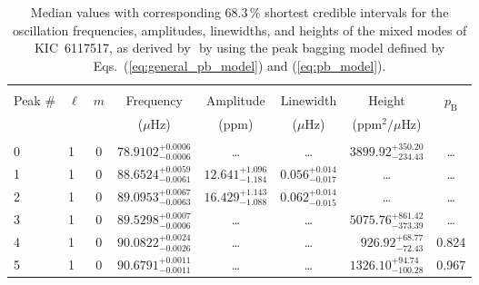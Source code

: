 \begin{table*}[!]
\caption{Median values with corresponding 68.3\,\% shortest credible intervals for the oscillation frequencies, amplitudes, linewidths, and heights of the mixed modes of KIC~6117517, as derived by \diamonds\,\,by using the peak bagging model defined by Eqs.~(\ref{eq:general_pb_model}) and (\ref{eq:pb_model}).}
\label{tab:6117517m}
\centering
\begin{tabular}{llcrrlrc}
\hline\hline
\\[-8pt]          
Peak \# & $\ell$ & $m$ & \multicolumn{1}{c}{Frequency} & \multicolumn{1}{c}{Amplitude} & \multicolumn{1}{c}{Linewidth} & \multicolumn{1}{c}{Height}& $p_\mathrm{B}$\\
 & & & \multicolumn{1}{c}{($\mu$Hz)} & \multicolumn{1}{c}{(ppm)} & \multicolumn{1}{c}{($\mu$Hz)} & \multicolumn{1}{c}{(ppm$^2/\mu$Hz)}\\
\hline \\[-8pt]
0 & 1 & 0 & $     78.9102_{-      0.0006}^{+      0.0006}$ & \multicolumn{1}{c}{\dots} & \multicolumn{1}{c}{\dots} & $     3899.92_{-      234.43}^{+      350.20}$ & \dots \\[1pt]
1 & 1 & 0 & $     88.6524_{-      0.0061}^{+      0.0059}$ & $      12.641_{-       1.184}^{+       1.096}$ & $       0.056_{-       0.017}^{+       0.014}$ & \multicolumn{1}{c}{\dots} & \dots \\[1pt]
2 & 1 & 0 & $     89.0953_{-      0.0063}^{+      0.0067}$ & $      16.429_{-       1.088}^{+       1.143}$ & $       0.062_{-       0.015}^{+       0.014}$ & \multicolumn{1}{c}{\dots} & \dots \\[1pt]
3 & 1 & 0 & $     89.5298_{-      0.0006}^{+      0.0007}$ & \multicolumn{1}{c}{\dots} & \multicolumn{1}{c}{\dots} & $     5075.76_{-      373.39}^{+      861.42}$ & \dots \\[1pt]
4 & 1 & 0 & $     90.0822_{-      0.0026}^{+      0.0024}$ & \multicolumn{1}{c}{\dots} & \multicolumn{1}{c}{\dots} & $      926.92_{-       72.43}^{+       68.77}$ & 0.824 \\[1pt]
5 & 1 & 0 & $     90.6791_{-      0.0011}^{+      0.0011}$ & \multicolumn{1}{c}{\dots} & \multicolumn{1}{c}{\dots} & $     1326.10_{-      100.28}^{+       94.74}$ & 0.967 \\[1pt]


\end{tabular}
\end{table*}
